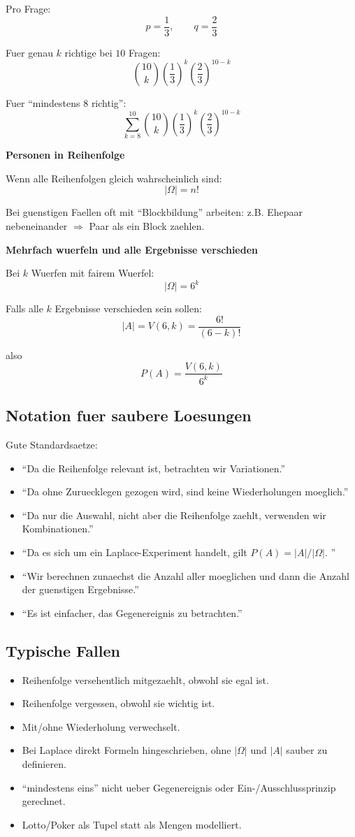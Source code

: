 \documentclass[a4paper,11pt]{article}
\begin{document}
Pro Frage:
\[
p = \frac{1}{3}, \qquad q = \frac{2}{3}
\]

Fuer genau $k$ richtige bei $10$ Fragen:
\[
\binom{10}{k}\left(\frac{1}{3}\right)^k\left(\frac{2}{3}\right)^{10-k}
\]

Fuer ``mindestens 8 richtig'':
\[
\sum_{k=8}^{10} \binom{10}{k}\left(\frac{1}{3}\right)^k\left(\frac{2}{3}\right)^{10-k}
\]

\textbf{Personen in Reihenfolge}

Wenn alle Reihenfolgen gleich wahrscheinlich sind:
\[
|\Omega| = n!
\]

Bei guenstigen Faellen oft mit ``Blockbildung'' arbeiten:
z.B. Ehepaar nebeneinander $\Rightarrow$ Paar als ein Block zaehlen.

\textbf{Mehrfach wuerfeln und alle Ergebnisse verschieden}

Bei $k$ Wuerfen mit fairem Wuerfel:
\[
|\Omega| = 6^k
\]

Falls alle $k$ Ergebnisse verschieden sein sollen:
\[
|A| = V(6,k) = \frac{6!}{(6-k)!}
\]

also
\[
P(A) = \frac{V(6,k)}{6^k}
\]

\subsection{Notation fuer saubere Loesungen}
Gute Standardsaetze:
\begin{itemize}
  \item ``Da die Reihenfolge relevant ist, betrachten wir Variationen.''
  \item ``Da ohne Zuruecklegen gezogen wird, sind keine Wiederholungen moeglich.''
  \item ``Da nur die Auswahl, nicht aber die Reihenfolge zaehlt, verwenden wir Kombinationen.''
  \item ``Da es sich um ein Laplace-Experiment handelt, gilt $P(A)=|A|/|\Omega|$. ''
  \item ``Wir berechnen zunaechst die Anzahl aller moeglichen und dann die Anzahl der guenstigen Ergebnisse.''
  \item ``Es ist einfacher, das Gegenereignis zu betrachten.''
\end{itemize}

\subsection{Typische Fallen}
\begin{itemize}
  \item Reihenfolge versehentlich mitgezaehlt, obwohl sie egal ist.
  \item Reihenfolge vergessen, obwohl sie wichtig ist.
  \item Mit/ohne Wiederholung verwechselt.
  \item Bei Laplace direkt Formeln hingeschrieben, ohne $|\Omega|$ und $|A|$ sauber zu definieren.
  \item ``mindestens eins'' nicht ueber Gegenereignis oder Ein-/Ausschlussprinzip gerechnet.
  \item Lotto/Poker als Tupel statt als Mengen modelliert.
\end{itemize}
\end{document}
